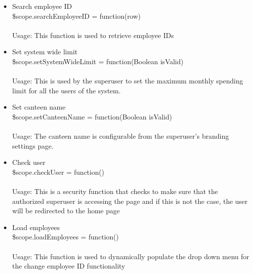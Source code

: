 \documentclass[a4paper,12pt]{article}
\begin{document}
\begin{enumerate}
\begin{itemize}
		\item Search employee ID \\ \$scope.searchEmployeeID = function(row) 
		\\ \\ Usage: This function is used to retrieve employee IDs 
		\item Set system wide limit \\ \$scope.setSystemWideLimit = function(Boolean isValid)  \\ \\ Usage: This is used by the superuser to set the maximum monthly spending limit for all the users of the system.
		 \item Set canteen name \\ \$scope.setCanteenName = function(Boolean isValid) 
		\\ \\ Usage: The canteen name is configurable from the superuser's branding settings page.
		\item Check user \\ \$scope.checkUser = function() 
		\\ \\Usage: This is a security function that checks to make sure that the authorized superuser is accessing the page and if this is not the case, the user will be redirected to the home page
		\item Load employees \\ \$scope.loadEmployees = function() 
		\\ \\Usage: This function is used to dynamically populate the drop down menu for the change employee ID functionality
	\end{itemize}
\end{enumerate}
\end{document}
